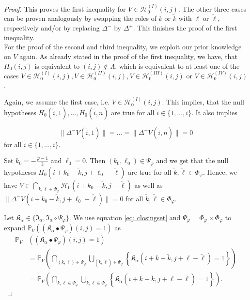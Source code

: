 \documentclass[a4paper,12pt]{article}
\newcommand{\norm}[1]{\lVert#1\rVert}
\theoremstyle{plain}
\theoremstyle{definition}
\numberwithin{equation}{section}
\begin{document}
\begin{proof}
	This proves the first inequality for $V \in \mathcal{H}_0^{(I)}(i, j)$. The other three cases can be proven analogously by swapping the roles of $k$ or $\tilde{k}$ with $\ell$ or $\tilde{\ell}$, respectively and/or by replacing $\Delta^-$ by $\Delta^+$. This finishes the proof of the first inequality.\\
	
	
	For the proof of the second and third inequality, we exploit our prior knowledge on $V$ again. As already stated in the proof of the first inequality, we have, that $H_0(i, j)$ is equivalent to $(i, j) \notin \varLambda$, which is equivalent to at least one of the cases $V \in \mathcal{H}_0^{(I)}(i, j), V \in \mathcal{H}_0^{(II)}(i, j), V \in \mathcal{H}_0^{(III)}(i, j)$ or $V \in \mathcal{H}_0^{(IV)}(i, j)$.
	
	Again, we assume the first case, i.e. $V \in \mathcal{H}_0^{(I)}(i, j)$. This implies, that the null hypotheses $H_0(\tilde{i}, 1), \ldots, H_0(\tilde{i}, n)$ are true for all $\tilde{i} \in \{ 1, \dots, i \}$. It also implies
	\begin{samepage}
		\begin{equation*}
			\norm{\Delta^- V(\tilde{i}, 1)} = \ldots = \norm{\Delta^- V(\tilde{i}, n)} = 0
		\end{equation*}
		for all $\tilde{i} \in \{ 1, \dots, i \}$.
	\end{samepage}
	
	Set $k_0 = -\frac{\varphi - 1}{2}$ and $\ell_0 = 0$. Then $(k_0, \ell_0) \in \Psi_\varphi$ and we get that the null hypotheses $H_0(i + k_0 - \tilde{k}, j + \ell_0 - \tilde{\ell})$ are true for all $\tilde{k}, \tilde{\ell} \in \Phi_\varphi$. Hence, we have $V \in \bigcap_{\tilde{k}, \tilde{\ell} \in \Phi_\varphi} \mathcal{H}_0(i + k_0 - \tilde{k}, j - \tilde{\ell})$ as well as $\norm{\Delta^- V(i + k_0 - \tilde{k}, j + \ell_0 - \tilde{\ell})} = 0$ for all $\tilde{k}, \tilde{\ell} \in \Phi_\varphi$.
	
	Let $\mathfrak{K}_\alpha \in \{ \mathfrak{I}_\alpha, \mathfrak{I}_\alpha \circ \Psi_\varphi \}$. We use equation \eqref{eq: closingset} and $\Psi_\varphi = \Phi_\varphi \times \Phi_\varphi$ to expand $\mathbb{P}_V\left( (\mathfrak{K}_\alpha \bullet \Psi_\varphi)(i, j) = 1 \right)$ as
	\begin{align*}
		\mathbb{P}_V&\left( (\mathfrak{K}_\alpha \bullet \Psi_\varphi)(i, j) = 1 \right) \\
		&= \mathbb{P}_V\left( \bigcap_{(k, \ell) \in \Psi_\varphi} \bigcup_{(\tilde{k}, \tilde{\ell}) \in \Psi_\varphi} \left\{ \mathfrak{K}_\alpha(i + k - \tilde{k}, j + \ell - \tilde{\ell}) = 1 \right\} \right) \\
		&= \mathbb{P}_V\left( \bigcap_{k, \ell \in \Phi_\varphi} \bigcup_{\tilde{k}, \tilde{\ell} \in \Phi_\varphi} \left\{ \mathfrak{K}_\alpha(i + k - \tilde{k}, j + \ell - \tilde{\ell}) = 1 \right\} \right).
	\end{align*}
	

\end{proof}
\end{document}
